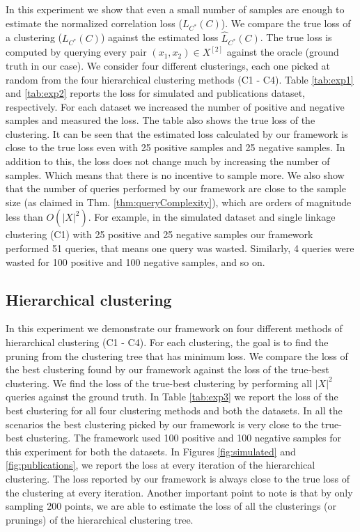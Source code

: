 In this experiment we show that even a small number of samples are enough to estimate the normalized correlation loss ($L_{C^*}(C)$).
We compare the true loss of a clustering ($L_{C^*}(C)$) against the estimated loss $\hat L_{C^*}(C)$.
The true loss is computed by querying every pair $(x_1, x_2) \in X^{[2]}$ against the oracle (ground truth in our case).
We consider four different clusterings, each one picked at random from the four hierarchical clustering methods (C1 - C4).
Table \ref{tab:exp1} and \ref{tab:exp2} reports the loss for simulated and publications dataset, respectively.
For each dataset we increased the number of positive and negative samples and measured the loss.
The table also shows the true loss of the clustering.
It can be seen that the estimated loss calculated by our framework is close to the true loss even with 25 positive samples and 25 negative samples.
In addition to this, the loss does not change much by increasing the number of samples.
Which means that there is no incentive to sample more.
We also show that the number of queries performed by our framework are close to the sample size (as claimed in Thm. \ref{thm:queryComplexity}), which are orders of magnitude less than $O(|X|^2)$.
For example, in the simulated dataset and single linkage clustering (C1) with 25 positive and 25 negative samples our framework performed 51 queries, that means one query was wasted. Similarly, 4 queries were wasted for 100 positive and 100 negative samples, and so on.

\subsection{Hierarchical clustering}
\label{sec:exp2}
In this experiment we demonstrate our framework on four different methods of hierarchical clustering (C1 - C4).
For each clustering, the goal is to find the pruning from the clustering tree that has minimum loss.
We compare the loss of the best clustering found by our framework against the loss of the true-best clustering.
We find the loss of the true-best clustering by performing all $|X|^2$ queries against the ground truth.
In Table \ref{tab:exp3} we report the loss of the best clustering for all four clustering methods and both the datasets.
In all the scenarios the best clustering picked by our framework is very close to the true-best clustering.
The framework used 100 positive and 100 negative samples for this experiment for both the datasets.
In Figures \ref{fig:simulated} and \ref{fig:publications}, we report the loss at every iteration of the hierarchical clustering.
The loss reported by our framework is always close to the true loss of the clustering at every iteration.
Another important point to note is that by only sampling 200 points, we are able to estimate the loss of all the clusterings (or prunings) of the hierarchical clustering tree. 